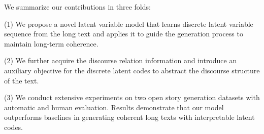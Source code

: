 \documentclass[11pt]{article}
\begin{document}
We summarize our contributions in three folds:

(1) We propose a novel latent variable model that learns discrete latent variable sequence from the long text and applies it to guide the generation process to maintain long-term coherence.

(2) We further acquire the discourse relation information and introduce an auxiliary objective for the discrete latent codes to abstract the discourse structure of the text.

(3) We conduct extensive experiments on two open story generation datasets with automatic and human evaluation. Results demonstrate that our model outperforms baselines in generating coherent long texts with interpretable latent codes. 




\end{document}

